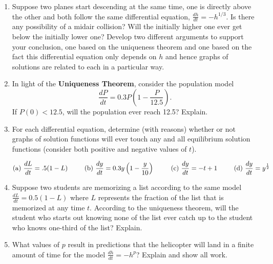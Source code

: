 \clearpage


\begin{enumerate}
\item Suppose two planes start descending at the same time, one is directly above the other and both follow the same differential equation, $\displaystyle\frac{dh}{dt}=-h^{1/3}$. Is there any possibility of a midair collision? Will the initially higher one ever get below the initially lower one? Develop two different arguments to support your conclusion, one based on the uniqueness theorem and one based on the fact this differential equation only depends on $h$ and hence graphs of solutions are related to each in a particular way. \label{05HWproblem1}

\item In light of the \textbf{Uniqueness Theorem}, consider the population model \label{05HWproblem2} 
\[
\frac{dP}{dt}=0.3P\left(1-\frac{P}{12.5}\right).
\]
If $P(0) < 12.5$, will the population ever reach 12.5? Explain.

\item For each differential equation, determine (with reasons) whether or not graphs of solution functions will ever touch any and all equilibrium solution functions (consider both positive and negative values of $t$). \label{05HWproblem3}

\[
\text{(a) } \frac{dL}{dt}=.5(1-L) \hspace{.35in}\text{(b) } \frac{dy}{dt}=0.3y\left(1-\frac{y}{10}\right) \hspace{.35in} \text{(c) } \frac{dy}{dt}=-t+1 \hspace{.35in} \text{(d) } \frac{dy}{dt}=y^{\frac{1}{2}}
\]

\item	Suppose two students are memorizing a list according to the same model  $\displaystyle \frac{dL}{dt}=0.5(1-L)$  where $L$ represents the fraction of the list that is memorized at any time $t$. According to the uniqueness theorem, will the student who starts out knowing none of the list ever catch up to the student who knows one-third of the list? Explain. \label{05HWproblem4}

\item	What values of $p$ result in predictions that the helicopter will land in a finite amount of time for the model $\displaystyle\frac{dh}{dt} = -h^p$? Explain and show all work. \label{05HWproblem5}


\end{enumerate}

